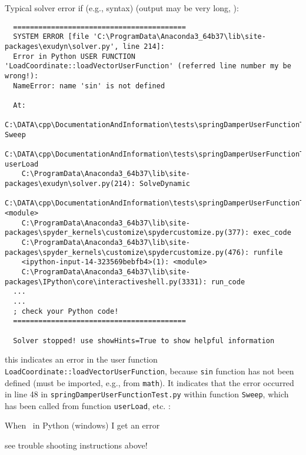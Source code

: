 \ei
\item Typical solver error if (e.g., syntax)  (output may be very long, ):
\begin{lstlisting}
  =========================================
  SYSTEM ERROR [file 'C:\ProgramData\Anaconda3_64b37\lib\site-packages\exudyn\solver.py', line 214]: 
  Error in Python USER FUNCTION 'LoadCoordinate::loadVectorUserFunction' (referred line number my be wrong!):
  NameError: name 'sin' is not defined

  At:
    C:\DATA\cpp\DocumentationAndInformation\tests\springDamperUserFunctionTest.py(48): Sweep
    C:\DATA\cpp\DocumentationAndInformation\tests\springDamperUserFunctionTest.py(54): userLoad
    C:\ProgramData\Anaconda3_64b37\lib\site-packages\exudyn\solver.py(214): SolveDynamic
    C:\DATA\cpp\DocumentationAndInformation\tests\springDamperUserFunctionTest.py(106): <module>
    C:\ProgramData\Anaconda3_64b37\lib\site-packages\spyder_kernels\customize\spydercustomize.py(377): exec_code
    C:\ProgramData\Anaconda3_64b37\lib\site-packages\spyder_kernels\customize\spydercustomize.py(476): runfile
    <ipython-input-14-323569bebfb4>(1): <module>
    C:\ProgramData\Anaconda3_64b37\lib\site-packages\IPython\core\interactiveshell.py(3331): run_code
  ...
  ...
  ; check your Python code!
  =========================================

  Solver stopped! use showHints=True to show helpful information
\end{lstlisting}
\onlyRST{\rstStartNewLine}
%
\bi
\item[$\ra$] this indicates an error in the user function \texttt{LoadCoordinate::loadVectorUserFunction}, because \texttt{sin} function has not been defined (must be imported, e.g., from \texttt{math}). It indicates that the error occurred in line 48 in \texttt{springDamperUserFunctionTest.py} within function \texttt{Sweep}, which has been called from function \texttt{userLoad}, etc.
\ei
\ei \vspace{12pt}
:
\bn
\item When  \codeName\ in Python (windows) I get an error 
\bi
\item[$\ra$] see trouble shooting instructions above!
